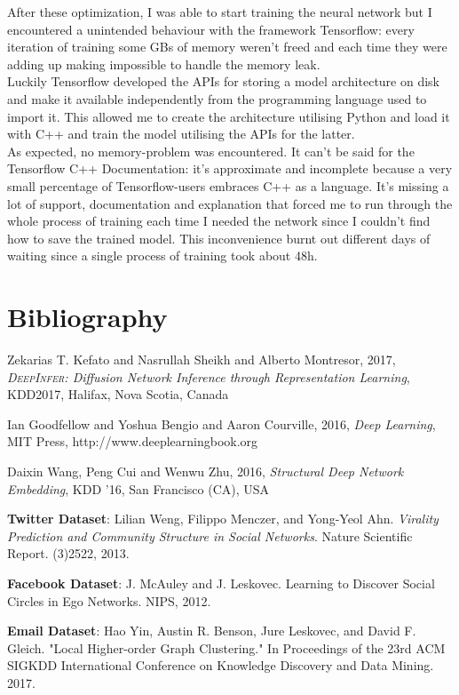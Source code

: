 \documentclass{article}
\begin{document}
			After these optimization, I was able to start training the neural network but I encountered a unintended behaviour with the framework Tensorflow: every iteration of training some GBs of memory weren't freed and each time they were adding up making impossible to handle the memory leak.\\
			Luckily Tensorflow developed the APIs for storing a model architecture on disk and make it available independently from the programming language used to import it. This allowed me to create the architecture utilising Python and load it with C++ and train the model utilising the APIs for the latter.\\
			As expected, no memory-problem was encountered. It can't be said for the Tensorflow C++ Documentation: it's approximate and incomplete because a very small percentage of Tensorflow-users embraces C++ as a language. It's missing a lot of support, documentation and explanation that forced me to run through the whole process of training each time I needed the network since I couldn't find how to save the trained model. This inconvenience burnt out different days of waiting since a single process of training took about 48h.
			
			
			\newpage
			
	\section{Bibliography}
	\begin{thebibliography}{10}	
		
		Zekarias T. Kefato and Nasrullah Sheikh and Alberto Montresor, 2017, \textit{\textsc{DeepInfer}: Diffusion Network Inference through Representation Learning}, KDD2017, Halifax, Nova Scotia, Canada
		
		Ian Goodfellow and Yoshua Bengio and Aaron Courville, 2016, \textit{Deep Learning}, MIT Press, http://www.deeplearningbook.org
		
		Daixin Wang, Peng Cui and Wenwu Zhu, 2016, \textit{Structural Deep Network Embedding}, KDD ’16, San Francisco (CA), USA
		
		\textbf{Twitter Dataset}: Lilian Weng, Filippo Menczer, and Yong-Yeol Ahn. \textit{Virality Prediction and Community Structure in Social Networks}. Nature Scientific Report. (3)2522, 2013.
		
		\textbf{Facebook Dataset}: J. McAuley and J. Leskovec. Learning to Discover Social Circles in Ego Networks. NIPS, 2012.
		
		\textbf{Email Dataset}: Hao Yin, Austin R. Benson, Jure Leskovec, and David F. Gleich. "Local Higher-order Graph Clustering." In Proceedings of the 23rd ACM SIGKDD International Conference on Knowledge Discovery and Data Mining. 2017.
		
		
	\end{thebibliography}
			
\end{document}
